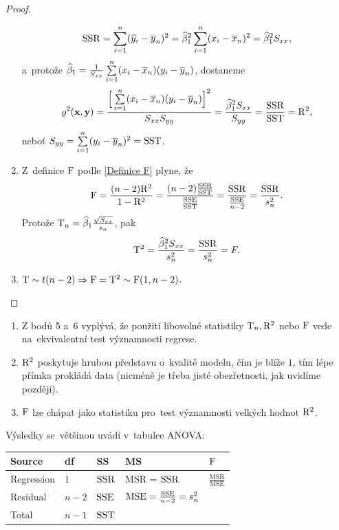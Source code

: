 \begin{theorem}
\begin{proof}
\begin{enumerate}
		$$ \mathrm{SSR} = \sum\limits_{i=1}^{n} (\widehat{y}_i-\overline{y}_n)^2=\widehat{\beta}_1^2\sum\limits_{i=1}^{n} (x_i-\overline{x}_n)^2 = \widehat{\beta}_1^2 S_{xx}, $$
		a~protože $\widehat{\beta}_1 = \frac{1}{S_{xx}}\sum\limits_{i=1}^{n} (x_i-\overline{x}_n)(y_i-\overline{y}_n)$, dostaneme
		 $$ \varrho^2(\textbf{x},\textbf{y}) = \frac{\Big[\sum\limits_{i=1}^{n} (x_i-\overline{x}_n)(y_i-\overline{y}_n)\Big]^2}{S_{xx} S_{yy}} = \frac{\widehat{\beta}_1^2 S_{xx}}{S_{yy}} = \frac{\mathrm{SSR}}{\mathrm{SST}} = \mathrm{R}^2, $$
		 neboť $S_{yy} = \sum\limits_{i=1}^{n} (y_i-\overline{y}_n)^2 = \mathrm{SST}$.
		\item Z~definice $\mathrm{F}$ podle \eqref{Definice F} plyne, že
		 $$ \mathrm{F} = \frac{(n-2)\mathrm{R}^2}{1-\mathrm{R}^2} = \frac{(n-2)\frac{\mathrm{SSR}}{\mathrm{SST}}}{\frac{\mathrm{SSE}}{\mathrm{SST}}} = \frac{\mathrm{SSR}}{\frac{\mathrm{SSE}}{n-2}} = \frac{\mathrm{SSR}}{s_n^2}. $$ Protože $\mathrm{T}_n = \widehat{\beta}_1\frac{\sqrt{S_{xx}}}{s_n}$, pak $$ \mathrm{T}^2 = \frac{\widehat{\beta}_1^2 S_{xx}}{s_n^2} = \frac{\mathrm{SSR}}{s_n^2} = F. $$
		\item $\mathrm{T}\sim t(n-2) \Rightarrow \mathrm{F} = \mathrm{T}^2\sim\mathrm{F}(1,n-2)$.
		
	\end{enumerate}
\end{proof}
\end{theorem}
\begin{remark}
\begin{enumerate}
	\item 	Z bodů 5 a~6 vyplývá, že použití libovolné statistiky $\mathrm{T}_n,\mathrm{R}^2$ nebo $\mathrm{F}$ vede na~ekvivalentní test významnosti regrese.
	\item $\mathrm{R}^2$ poskytuje hrubou představu o~kvalitě modelu, čím je blíže $1$, tím lépe přímka prokládá data (nicméně je třeba jisté obezřetnosti, jak uvidíme později).
	\item $\mathrm{F}$ lze chápat jako statistiku pro~test významnosti velkých hodnot $\mathrm{R}^2$.
\end{enumerate}
\end{remark}
Výsledky se~většinou uvádí v~tabulce ANOVA:
\begin{table}[h]\label{ANOVA_table}
	\begin{tabular}{|lllll|}
	\hline
	Source & df & SS & MS & $\mathrm{F}$\\
	\hline
	Regression & 1 & $\mathrm{SSR}$ & MSR = $\mathrm{SSR}$ & $\frac{\mathrm{MSR}}{\mathrm{MSE}}$ \\
	Residual & $n-2$ & $\mathrm{SSE}$ & $\mathrm{MSE} = \frac{\mathrm{\mathrm{SSE}}}{n-2} = s_n^2$ & \\
	Total & $n-1$ & $\mathrm{SST}$ & & \\ \hline
\end{tabular}
\end{table}

